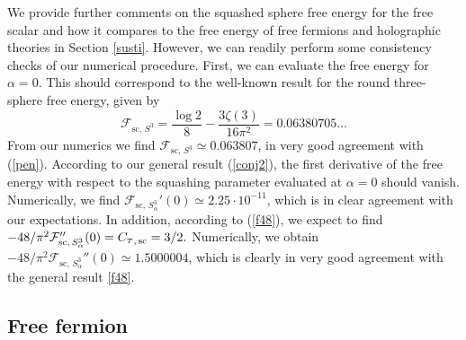 \documentclass[12pt]{article}
\numberwithin{equation}{section}
\newcommand{\req}[1]{(\ref{#1})} %
\newcommand{\ssc}{\scriptscriptstyle}
\newcommand{\ctt}{C_{\ssc T}}
\begin{document}
We provide further comments on the squashed sphere free energy for the free scalar and how it compares to the free energy of free fermions and holographic theories in Section \ref{susti}. However, we can readily perform some consistency checks of our numerical procedure. First, we can evaluate the free energy for $\alpha=0$. This should correspond to the well-known result for the round three-sphere free energy, given by \cite{Klebanov:2011gs} 
%
\begin{equation}\label{pen}
\mathcal{F}_{\textrm{sc},\,  S^3}=\frac{\log 2}{8} - \frac{3 \zeta(3)}{16 \pi^2}= 0.06380705\dots
\end{equation}
%
From our numerics we find $\mathcal{F}_{\textrm{sc},\,  S^3}\simeq  0.063807$, in very good agreement with \req{pen}. According to our general result \req{conj2}, the first derivative of the free energy with respect to the squashing parameter evaluated at $\alpha=0$ should vanish. Numerically, we find
%
$\mathcal{F}_{\textrm{sc},\,S^3_\alpha}'(0) \simeq 2.25 \cdot 10^{-11}$,
which is in clear agreement with our expectations. In addition, according to \req{f48}, we expect to find
$
-48/\pi^2\mathcal{F}_{\textrm{sc},\, S^3_\alpha}''(0)=  {\ctt}_{,\,\rm sc}=3/2.
$
Numerically, we obtain
$
-48/\pi^2 \mathcal{F}_{\textrm{sc},\,S^3_\alpha}''(0)\simeq 1.5000004
$,
which is clearly in very good agreement with the general result \eqref{f48}. 



\subsection{Free fermion}
\label{sec:3dferm}
\end{document}
